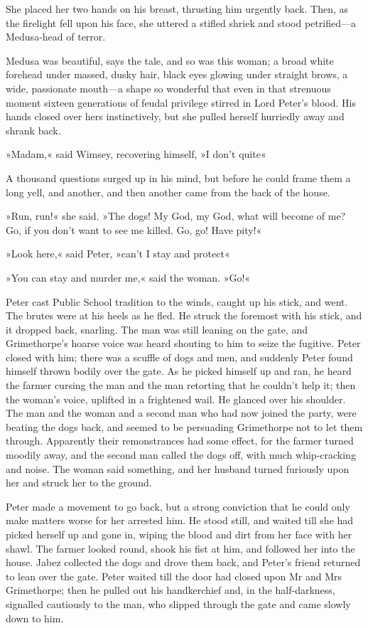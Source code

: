 She placed her two hands on his breast, thrusting him urgently back.  Then, as the firelight fell upon his face, she uttered a stifled shriek and stood petrified\allowbreak---\allowbreak a Medusa-head of terror.

Medusa was beautiful, says the tale, and so was this woman; a broad white forehead under massed, dusky hair, black eyes glowing under straight brows, a wide, passionate mouth\allowbreak---\allowbreak a shape so wonderful that even in that strenuous moment sixteen generations of feudal privilege stirred in Lord Peter's blood. His hands closed over hers instinctively, but she pulled herself hurriedly away and shrank back.

»Madam,« said Wimsey, recovering himself, »I don't quite\longdash«

A thousand questions surged up in his mind, but before he could frame them a long yell, and another, and then another came from the back of the house.

»Run, run!« she said. »The dogs! My God, my God, what will become of me? Go, if you don't want to see me killed. Go, go! Have pity!«

»Look here,« said Peter, »can't I stay and protect\longdash«

»You can stay and murder me,« said the woman. »Go!«

Peter cast Public School tradition to the winds, caught up his stick, and went. The brutes were at his heels as he fled. He struck the foremost with his stick, and it dropped back, snarling. The man was still leaning on the gate, and Grimethorpe's hoarse voice was heard shouting to him to seize the fugitive. Peter closed with him; there was a scuffle of dogs and men, and suddenly Peter found himself thrown bodily over the gate. As he picked himself up and ran, he heard the farmer cursing the man and the man retorting that he couldn't help it; then the woman's voice, uplifted in a frightened wail. He glanced over his shoulder. The man and the woman and a second man who had now joined the party, were beating the dogs back, and seemed to be persuading Grimethorpe not to let them through. Apparently their remonstrances had some effect, for the farmer turned moodily away, and the second man called the dogs off, with much whip-cracking and noise. The woman said something, and her husband turned furiously upon her and struck her to the ground.

Peter made a movement to go back, but a strong conviction that he could only make matters worse for her arrested him. He stood still, and waited till she had picked herself up and gone in, wiping the blood and dirt from her face with her shawl. The farmer looked round, shook his fist at him, and followed her into the house. Jabez collected the dogs and drove them back, and Peter's friend returned to lean over the gate.
Peter waited till the door had closed upon Mr and Mrs Grimethorpe; then he pulled out his handkerchief and, in the half-darkness, signalled cautiously to the man, who slipped through the gate and came slowly down to him.

